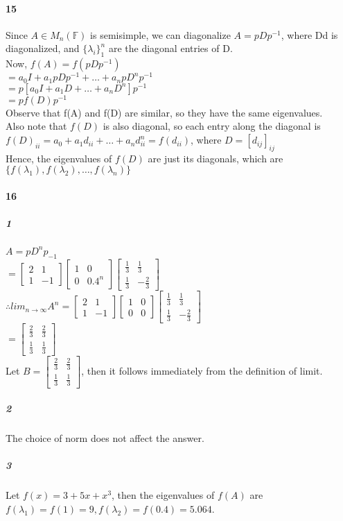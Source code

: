 \documentclass[10pt,letter]{article}
\begin{document}
\paragraph{15}
Since $A\in M_n(\mathbb{F})$ is semisimple, we can diagonalize $A=pDp^{-1}$, where Dd is diagonalized, and $\{\lambda_i\}_1^n$ are the diagonal entries of D. \\
Now, $f(A)=f(pDp^{-1})$\\
$=a_0 I+ a_1pDp^{-1}+\dots+a_npD^np^{-1}$\\
$=p[a_0I+a_1D+\dots+a_nD^n]p^{-1}$\\
$=pf(D)p^{-1}$\\
Observe that f(A) and f(D) are similar, so they have the same eigenvalues. \\
Also note that $f(D)$ is also diagonal, so each entry along the diagonal is $f(D)_{ii}=a_0+a_1d_{ii}+\dots+a_nd_{ii}^n=f(d_{ii})$, where $D=[d_{ij}]_{ij}$\\
Hence, the eigenvalues of $f(D)$ are just its diagonals, which are $\{f(\lambda_1),f(\lambda_2),\dots,f(\lambda_n) \}$
\paragraph{16}
\subparagraph{1}
$A=pD^np_{-1}$\\
$=\begin{bmatrix}
2&1\\1&-1
\end{bmatrix}\begin{bmatrix}
1&0\\0&0.4^n
\end{bmatrix}\begin{bmatrix}
\frac{1}{3}&\frac{1}{3}\\\frac{1}{3}&-\frac{2}{3}
\end{bmatrix}$\\
$\therefore lim_{n\to\infty}A^n=\begin{bmatrix}
2&1\\1&-1
\end{bmatrix}\begin{bmatrix}
1&0\\0&0
\end{bmatrix}\begin{bmatrix}
\frac{1}{3}&\frac{1}{3}\\\frac{1}{3}&-\frac{2}{3}
\end{bmatrix}$\\
$=\begin{bmatrix}
\frac{2}{3}&\frac{2}{3}\\\frac{1}{3}&\frac{1}{3}
\end{bmatrix}$\\
Let $B=\begin{bmatrix}
\frac{2}{3}&\frac{2}{3}\\\frac{1}{3}&\frac{1}{3}
\end{bmatrix}$, then it follows immediately from the definition of limit.
\subparagraph{2}
The choice of norm does not affect the answer.
\subparagraph{3}
Let $f(x)=3+5x+x^3$, then the eigenvalues of $f(A)$ are $f(\lambda_1)= f(1)=9, f(\lambda_2)= f(0.4)=5.064$.
\end{document}
